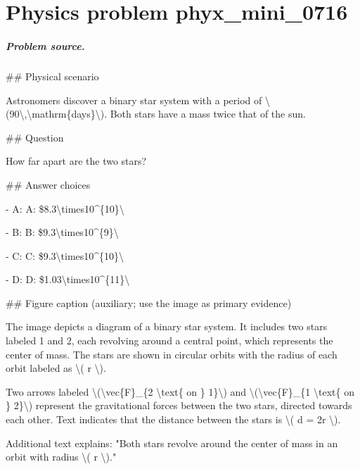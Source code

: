 
\chapter{Physics problem phyx\_mini\_0716}
\label{ch:PhyXMiniProblems_problem_phyx_mini_0716}

\paragraph{Problem source.}
\#\# Physical scenario

Astronomers discover a binary star system with a period of \textbackslash{}(90\textbackslash{},\textbackslash{}mathrm\{days\}\textbackslash{}). Both stars have a mass twice that of the sun.

\#\# Question

How far apart are the two stars?

\#\# Answer choices

- A: A: \$8.3\textbackslash{}times10\textasciicircum{}\{10\}\textbackslash{}

- B: B: \$9.3\textbackslash{}times10\textasciicircum{}\{9\}\textbackslash{}

- C: C: \$9.3\textbackslash{}times10\textasciicircum{}\{10\}\textbackslash{}

- D: D: \$1.03\textbackslash{}times10\textasciicircum{}\{11\}\textbackslash{}

\#\# Figure caption (auxiliary; use the image as primary evidence)

The image depicts a diagram of a binary star system. It includes two stars labeled 1 and 2, each revolving around a central point, which represents the center of mass. The stars are shown in circular orbits with the radius of each orbit labeled as \textbackslash{}( r \textbackslash{}). 

Two arrows labeled \textbackslash{}(\textbackslash{}vec\{F\}\_\{2 \textbackslash{}text\{ on \} 1\}\textbackslash{}) and \textbackslash{}(\textbackslash{}vec\{F\}\_\{1 \textbackslash{}text\{ on \} 2\}\textbackslash{}) represent the gravitational forces between the two stars, directed towards each other. Text indicates that the distance between the stars is \textbackslash{}( d = 2r \textbackslash{}).

Additional text explains: "Both stars revolve around the center of mass in an orbit with radius \textbackslash{}( r \textbackslash{})."

